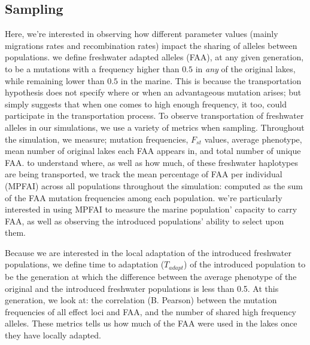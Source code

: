 \documentclass{article}
\begin{document}

\subsection{Sampling}


Here, we're interested in observing how different parameter values
(mainly migrations rates and recombination rates)
impact the sharing of alleles between populations. 
we define freshwater adapted alleles (FAA),
at any given generation,
to be a mutations with a frequency higher than $0.5$ in \textit{any} of the original lakes, 
while remaining lower than $0.5$ in the marine. 
This is because the transportation hypothesis does not specify where or when an advantageous mutation arises; 
but simply suggests that when one comes to high enough frequency, it too, could participate in the transportation process. \cite{Schluter2009}
To observe transportation of freshwater alleles in our simulations, we use a variety of metrics when sampling.
Throughout the simulation, we measure;
mutation frequencies, 
$F_{st}$ values, 
average phenotype, 
mean number of original lakes each FAA appears in,
and total number of unique FAA. 
to understand where, as well as how much, of these freshwater haplotypes are being transported,
we track the mean percentage of FAA per individual (MPFAI) across all populations throughout the simulation:
computed as the sum of the FAA mutation frequencies among each population.
we're particularly interested in using MPFAI to measure the marine population' capacity to carry FAA,
as well as observing the introduced populations' ability to select upon them. 

Because we are interested in the local adaptation of the introduced freshwater populations,
we define time to adaptation ($T_{adapt}$) of the introduced population to be the generation at which
the difference between the average phenotype of the original and the introduced freshwater populations is less than 0.5. 
At this generation, we look at:
the correlation (B. Pearson) between the mutation frequencies of all effect loci and FAA,
and the number of shared high frequency alleles. 
These metrics tells us how much of the FAA  were used in the lakes once they have locally adapted. 
\end{document}
